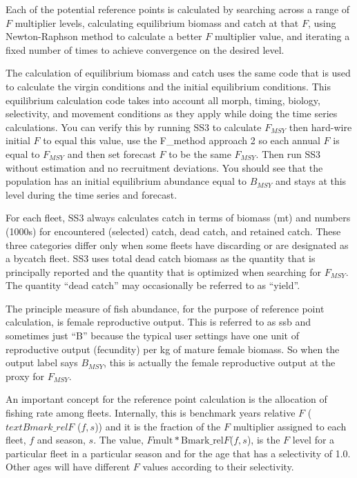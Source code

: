 Each of the potential reference points is calculated by searching across a range of $F$ multiplier levels, calculating equilibrium biomass and catch at that $F$, using Newton-Raphson method to calculate a better $F$ multiplier value, and iterating a fixed number of times to achieve convergence on the desired level.

The calculation of equilibrium biomass and catch uses the same code that is used to calculate the virgin conditions and the initial equilibrium conditions. This equilibrium calculation code takes into account all morph, timing, biology, selectivity, and movement conditions as they apply while doing the time series calculations. You can verify this by running SS3 to calculate $F_{MSY}$ then hard-wire initial $F$ to equal this value, use the F\_method approach 2 so each annual $F$ is equal to $F_{MSY}$ and then set forecast $F$ to be the same $F_{MSY}$. Then run SS3 without estimation and no recruitment deviations. You should see that the population has an initial equilibrium abundance equal to $B_{MSY}$ and stays at this level during the time series and forecast.

For each fleet, SS3 always calculates catch in terms of biomass (mt) and numbers (1000s) for encountered (selected) catch, dead catch, and retained catch. These three categories differ only when some fleets have discarding or are designated as a bycatch fleet. SS3 uses total dead catch biomass as the quantity that is principally reported and the quantity that is optimized when searching for $F_{MSY}$. The quantity ``dead catch'' may occasionally be referred to as ``yield''.

The principle measure of fish abundance, for the purpose of reference point calculation, is female reproductive output. This is referred to as \gls{ssb} and sometimes just ``B'' because the typical user settings have one unit of reproductive output (fecundity) per kg of mature female biomass. So when the output label says $B_{MSY}$, this is actually the female reproductive output at the proxy for $F_{MSY}$.

An important concept for the reference point calculation is the allocation of fishing rate among fleets. Internally, this is benchmark years relative $F$ ($text{Bmark\_rel}F$ ($f,s$)) and it is the fraction of the $F$ multiplier assigned to each fleet, $f$ and season, $s$. The value, $F\text{mult} * \text{Bmark\_rel}F$($f,s$), is the $F$ level for a particular fleet in a particular season and for the age that has a selectivity of 1.0. Other ages will have different $F$ values according to their selectivity.

